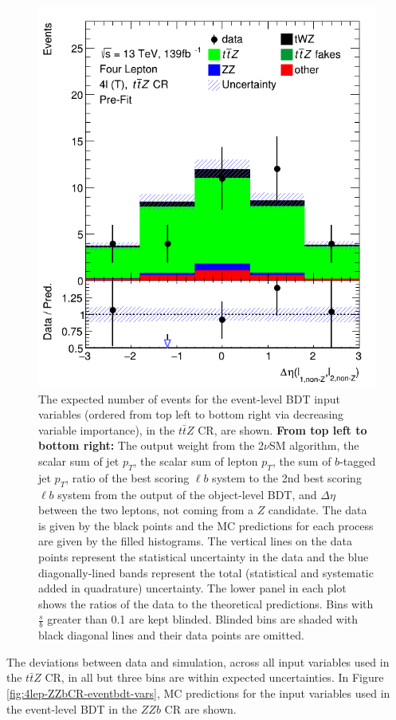 \begin{figure}[htbp]
   \includegraphics[width=.3\textwidth]{figures/bdtPlots/lep4_ttZ_4T_delEta_lNonZ_lNonZ.png}

\caption{The expected number of events for the event-level BDT input variables (ordered from top left to bottom right via decreasing variable importance), in the $t\bar{t}Z$ CR, are shown. \textbf{From top left to bottom right:} The output weight from the 2$\nu$SM algorithm, the scalar sum of jet $p_{T}$, the scalar sum of lepton $p_{T}$, the sum of $b$-tagged jet $p_{T}$, ratio of the best scoring $\ell b$ system to the 2nd best scoring $\ell b$ system from the output of the object-level BDT, and $\Delta \eta$ between the two leptons, not coming from a $Z$ candidate. The data is given by the black points and the MC predictions for each process are given by the filled histograms. The vertical lines on the data points represent the statistical uncertainty in the data and the blue diagonally-lined bands represent the total (statistical and systematic added in quadrature) uncertainty. The lower panel in each plot shows the ratios of the data to the theoretical predictions. Bins with $\frac{s}{b}$ greater than 0.1 are kept blinded. Blinded bins are shaded with black diagonal lines and their data points are omitted.}
  \label{fig:4lep-ttZCR-eventbdt-vars}
\end{figure}The deviations between data and simulation, across all input variables used in the $t\bar{t}Z$ CR, in all but three bins are within expected uncertainties. In Figure \ref{fig:4lep-ZZbCR-eventbdt-vars}, MC predictions for the input variables used in the event-level BDT in the $ZZb$ CR are shown.
